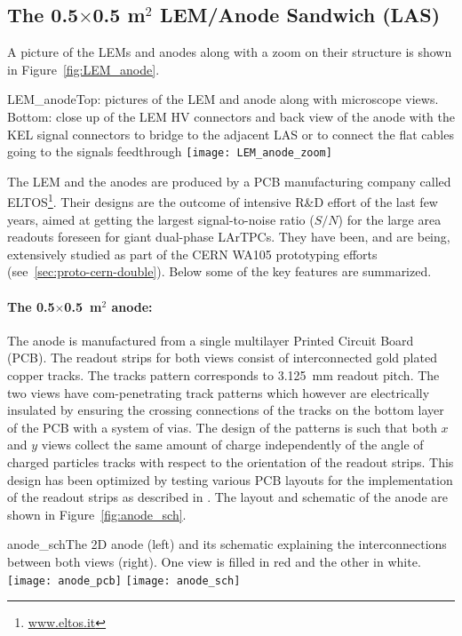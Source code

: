 \subsection{The 0.5$\times$0.5 m$^2$  LEM/Anode Sandwich (LAS)}

A picture of the LEMs and anodes along with a zoom on their structure
is shown in Figure~\ref{fig:LEM_anode}.
\begin{cdrfigure}{LEM_anode}{Top: pictures of the LEM and anode along with microscope
  views. Bottom: close up of the LEM HV connectors and back view of the anode with the KEL signal connectors to bridge to the adjacent LAS or to connect the flat cables going to the signals feedthrough}
 \texttt{[image: LEM\_anode\_zoom]}  
 \end{cdrfigure}

The LEM and the anodes are produced by a PCB manufacturing company
called ELTOS\footnote{\url{www.eltos.it}}. Their designs are the
outcome of intensive R\&D effort of the last few years, aimed at
getting the largest signal-to-noise ratio ($S/N$) for the large area
readouts foreseen for giant dual-phase LArTPCs. They have
been, and are being, extensively studied as part of the CERN WA105
prototyping efforts (see~\ref{sec:proto-cern-double}). Below some of
the key features are summarized.

 \paragraph{The 0.5$\times$0.5~m$^2$ anode:}
The anode is manufactured from a single multilayer Printed Circuit
Board (PCB). The readout strips for both views consist of
interconnected gold plated copper tracks. The tracks pattern
corresponds to 3.125~mm readout pitch. The two views have
com-penetrating track patterns which however are electrically
insulated by ensuring the crossing connections of the tracks on the
bottom layer of the PCB with a system of vias. The design of the
patterns is such that both $x$ and $y$ views collect the same amount
of charge independently of the angle of charged particles tracks with
respect to the orientation of the readout strips. This design has been
optimized by testing various PCB layouts for the implementation of the
readout strips as described in \cite{Cantini:2013yba}.  The layout and
schematic of the anode are shown in Figure~\ref{fig:anode_sch}.
\begin{cdrfigure}{anode_sch}{The 2D anode (left) and its schematic explaining the  interconnections between both views (right). One view is filled  in red and the other in white.}
\texttt{[image: anode\_pcb]} \hspace{0.2cm} \texttt{[image: anode\_sch]}
\end{cdrfigure}

